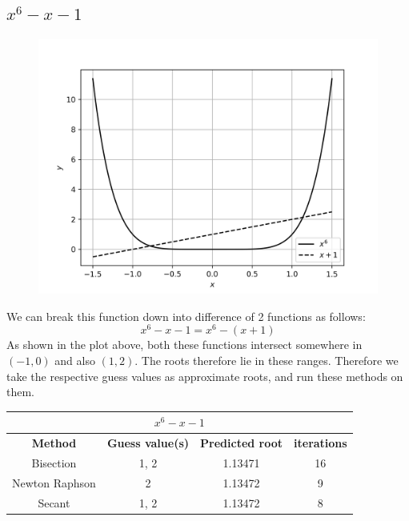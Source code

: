 \documentclass[12,a4paper]{article}
\begin{document}
    \subsection{$x^6 - x - 1$}
    \begin{figure}[H]
        \centering
        \includegraphics[width = \textwidth]{plots/p1.png}
        \label{fig:my_label}
    \end{figure}
    We can break this function down into difference of 2 functions as follows:
    \begin{equation}
        x^6-x-1 = x^6 - (x+1)
    \end{equation}
    As shown in the plot above, both these functions intersect somewhere in $(-1,0)$ and also $(1,2)$. The roots therefore lie in these ranges. Therefore we take the respective guess values as approximate roots, and run these methods on them.
    \begin{table}[h!]
        \centering
        \begin{tabular}{|c|c c c|} 
            \hline
            \multicolumn{4}{|c|}{$x^6 - x - 1$}\\
            \hline
            \textbf{Method}&\textbf{Guess value(s)}&\textbf{Predicted root}&\textbf{iterations} \\ [0.5ex] 
            \hline
            Bisection & 1, 2 & 1.13471 & 16 \\ 
            Newton Raphson & 2 & 1.13472 & 9 \\
            Secant & 1, 2 & 1.13472 & 8 \\[1ex] 
            \hline
        \end{tabular}
    \end{table}
\end{document}
